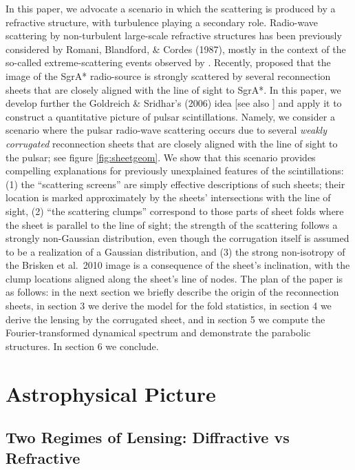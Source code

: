 \documentclass[useAMS,usenatbib]{mn2e}
\begin{document}
In this paper, we advocate a scenario in which the scattering is produced by a refractive structure, 
with turbulence playing a secondary role.
Radio-wave scattering by non-turbulent large-scale refractive structures has been previously
considered by Romani, Blandford, \& Cordes (1987), mostly in the context of the so-called
extreme-scattering events observed by
\cite{1987Natur.326..675F}. Recently, \cite{2006ApJ...640L.159G}
proposed that the image of the SgrA* radio-source is  
strongly scattered by several reconnection sheets that are closely aligned with the line of sight to
SgrA*.
In this paper, we develop further the Goldreich \& Sridhar's (2006) idea [see also \cite{2012MNRAS.421L.132P}] 
and apply it to construct a quantitative
picture of pulsar scintillations. Namely, we consider a scenario where
the pulsar radio-wave scattering occurs due to several {\it weakly corrugated} 
reconnection sheets that are
closely aligned with the line of sight to the pulsar; see figure \ref{fig:sheetgeom}.  We show that this scenario provides
compelling explanations for previously unexplained features of the scintillations: 
(1)  the ``scattering screens'' are simply effective descriptions of such sheets; their location is marked 
approximately
by the sheets' intersections with the line of sight, (2) ``the scattering clumps'' correspond to 
those parts of sheet folds where the sheet is parallel 
to
the line of sight; the strength of the scattering follows a strongly non-Gaussian distribution, even though
the corrugation itself is assumed to be a realization of a Gaussian distribution, and (3) the
strong non-isotropy of the Brisken et al.~2010 image is a consequence of the sheet's inclination, 
with the clump locations aligned along the sheet's line of nodes. The plan of the paper is
as follows: in the next section we briefly describe the origin of the
reconnection sheets, in section 3  we derive the model for the fold statistics,
in section 4 we derive the lensing by the corrugated sheet, and in section 5 we compute the
Fourier-transformed dynamical spectrum and demonstrate the parabolic structures. In section 6 we conclude.



\section{Astrophysical Picture}

\subsection{Two Regimes of Lensing: Diffractive vs Refractive}
\end{document}
